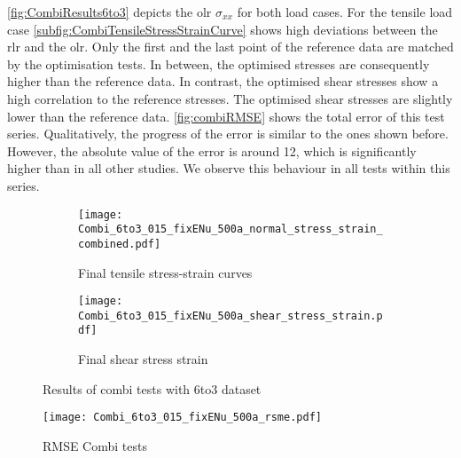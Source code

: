 \autoref{fig:CombiResults6to3} depicts the \acrlong{olr} $\sigma_{xx}$ for both load cases. For the tensile load case \autoref{subfig:CombiTensileStressStrainCurve} shows high deviations between the \acrlong{rlr} and the \acrlong{olr}. Only the first and the last point of the reference data are matched by the optimisation tests. In between, the optimised stresses are consequently higher than the reference data. In contrast, the optimised shear stresses show a high correlation to the reference stresses. The optimised shear stresses are slightly lower than the reference data. \autoref{fig:combiRMSE} shows the total error of this test series. Qualitatively, the progress of the error is similar to the ones shown before. However, the absolute value of the error is around 12, which is significantly higher than in all other studies. We observe this behaviour in all tests within this series. 

\begin{figure}[H]
\centering
\begin{subfigure}[t]{0.495\textwidth}
    \centering
    \texttt{[image: Combi\_6to3\_015\_fixENu\_500a\_normal\_stress\_strain\_combined.pdf]}
    \caption{Final tensile stress-strain curves}
    \label{subfig:CombiTensileStressStrainCurve}
\end{subfigure}
\hfill
\begin{subfigure}[t]{0.495\textwidth}
    \centering
    \texttt{[image: Combi\_6to3\_015\_fixENu\_500a\_shear\_stress\_strain.pdf]}
    \caption{Final shear stress strain}
    \label{subfig:CombiShearStressStrain}
\end{subfigure}
\caption{Results of combi tests with 6to3 dataset}
\label{fig:CombiResults6to3}
\end{figure}

\begin{figure}[H]
    \centering
    \texttt{[image: Combi\_6to3\_015\_fixENu\_500a\_rsme.pdf]}
    \caption{RMSE Combi tests}
    \label{fig:combiRMSE}
\end{figure}

